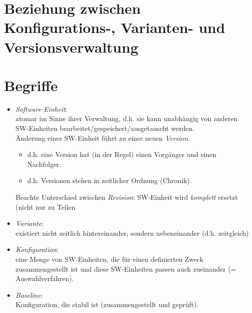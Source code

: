 \section{Beziehung zwischen Konfigurations-, Varianten- und Versionsverwaltung}

\section{Begriffe}
\begin{itemize}
\item \emph{Software-Einheit}:\\
atomar im Sinne ihrer Verwaltung, d.h. sie kann unabhängig von anderen SW-Einheiten bearbeitet/gespeichert/ausgetauscht werden.\\
Änderung einer SW-Einheit führt zu einer neuen \emph{Version}.
\begin{itemize}[label=$\rightarrow$]
\item d.h. eine Version hat (in der Regel) einen Vorgänger und einen Nachfolger.
\item d.h. Versionen stehen in zeitlicher Ordnung (Chronik).
\end{itemize}
Beachte Unterschied zwischen \emph{Revision}: SW-Einheit wird \emph{komplett} ersetzt (nicht nur zu Teilen
\item \emph{Variante}:\\
existiert nicht zeitlich hintereinander, sondern nebeneinander (d.h. zeitgleich)
\item \emph{Konfiguration}:\\
eine Menge von SW-Einheiten, die für einen definierten Zweck zusammengestellt ist und diese SW-Einheiten passen auch zueinander (= Auswahlverfahren).
\item \emph{Baseline}:\\
Konfiguration, die stabil ist (zusammengestellt und geprüft).
\end{itemize}

